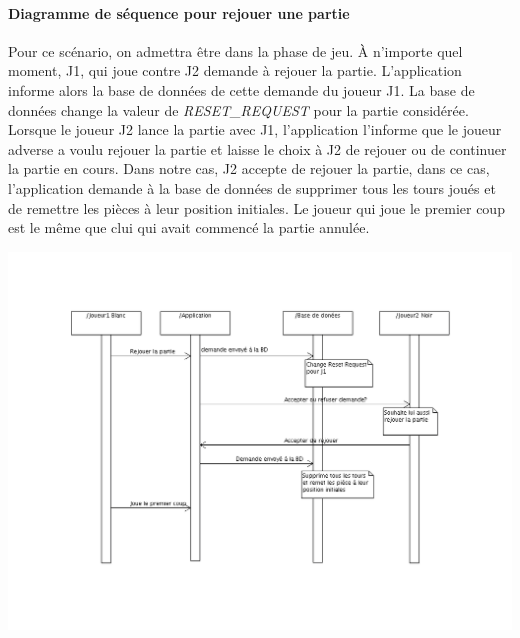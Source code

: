 \documentclass[10pt,a4paper]{report}
\begin{document}
\paragraph{Diagramme de séquence pour rejouer une partie}Pour ce scénario, on admettra être dans la phase de jeu. À n'importe quel moment, J1, qui joue contre J2 demande à rejouer la partie. L'application informe alors la base de données de cette demande du joueur J1. La base de données change la valeur de \textit{RESET\_REQUEST} pour la partie considérée. Lorsque le joueur J2 lance la partie avec J1, l'application l'informe que le joueur adverse a voulu rejouer la partie et laisse le choix à J2 de rejouer ou de continuer la partie en cours. Dans notre cas, J2 accepte de rejouer la partie, dans ce cas, l'application demande à la base de données de supprimer tous les tours joués et de remettre les pièces à leur position initiales. Le joueur qui joue le premier coup est le même que clui qui avait commencé la partie annulée.
\begin{center}
\includegraphics[width=18cm]{DiagSeqRejouerPartie.png}
\end{center}
\end{document}
